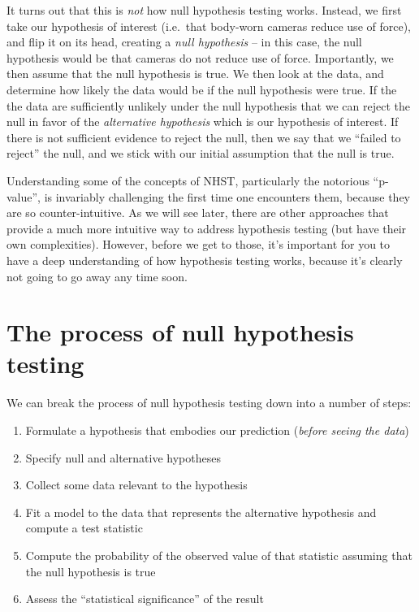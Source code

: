 \documentclass[12pt,]{book}
\providecommand{\tightlist}{%
  \setlength{\itemsep}{0pt}\setlength{\parskip}{0pt}}
\theoremstyle{definition}
\theoremstyle{definition}
\theoremstyle{definition}
\theoremstyle{remark}
\begin{document}
It turns out that this is \emph{not} how null hypothesis testing works. Instead, we first take our hypothesis of interest (i.e.~that body-worn cameras reduce use of force), and flip it on its head, creating a \emph{null hypothesis} -- in this case, the null hypothesis would be that cameras do not reduce use of force. Importantly, we then assume that the null hypothesis is true. We then look at the data, and determine how likely the data would be if the null hypothesis were true. If the the data are sufficiently unlikely under the null hypothesis that we can reject the null in favor of the \emph{alternative hypothesis} which is our hypothesis of interest. If there is not sufficient evidence to reject the null, then we say that we ``failed to reject'' the null, and we stick with our initial assumption that the null is true.

Understanding some of the concepts of NHST, particularly the notorious ``p-value'', is invariably challenging the first time one encounters them, because they are so counter-intuitive. As we will see later, there are other approaches that provide a much more intuitive way to address hypothesis testing (but have their own complexities). However, before we get to those, it's important for you to have a deep understanding of how hypothesis testing works, because it's clearly not going to go away any time soon.

\hypertarget{the-process-of-null-hypothesis-testing}{%
\section{The process of null hypothesis testing}\label{the-process-of-null-hypothesis-testing}}

We can break the process of null hypothesis testing down into a number of steps:

\begin{enumerate}
\def\labelenumi{\arabic{enumi}.}
\tightlist
\item
  Formulate a hypothesis that embodies our prediction (\emph{before seeing the data})
\item
  Specify null and alternative hypotheses
\item
  Collect some data relevant to the hypothesis
\item
  Fit a model to the data that represents the alternative hypothesis and compute a test statistic
\item
  Compute the probability of the observed value of that statistic assuming that the null hypothesis is true
\item
  Assess the ``statistical significance'' of the result
\end{enumerate}
\end{document}
